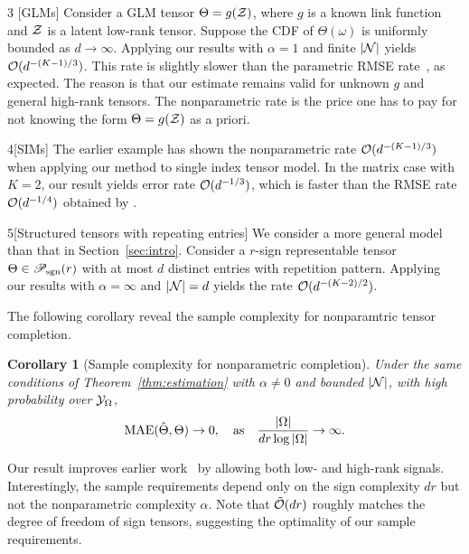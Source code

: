 \documentclass{article}
\theoremstyle{plain}
\newtheorem{cor}{Corollary}
\theoremstyle{definition}
\def\caliP{\mathscr{P}_{\textup{sgn}}}
\begin{document}
\begin{customexample}{3} [GLMs] 
Consider a GLM tensor $\Theta=g(\mathcal{Z})$, where $g$ is a known link function and $\mathcal{Z}$ is a latent low-rank tensor. Suppose the CDF of $\Theta(\omega)$ is uniformly bounded as $d\to\infty$. Applying our results with $\alpha=1$ and finite $|\mathcal{N}|$ yields $\mathcal{O}(d^{-(K-1)/3})$. This rate is slightly slower than the parametric RMSE rate~\citep{zhang2018tensor,wang2018learning}, as expected. The reason is that our estimate remains valid for unknown $g$ and general high-rank tensors. The nonparametric rate is the price one has to pay for not knowing the form $\Theta=g(\mathcal{Z})$ as a priori. 
\end{customexample}
\vspace{.05cm}

\begin{customexample}{4}[SIMs]
The earlier example has shown the nonparametric rate $\mathcal{O}(d^{-(K-1)/3})$ when applying our method to single index tensor model. In the matrix case with $K=2$, our result yields error rate $\mathcal{O}(d^{-1/3})$, which is faster than the RMSE rate $\mathcal{O}(d^{-1/4})$ obtained by \cite{ganti2015matrix}. 
\end{customexample}
\vspace{.05cm}

\begin{customexample}{5}[Structured tensors with repeating entries]
We consider a more general model than that in Section~\ref{sec:intro}. Consider a $r$-sign representable tensor $\Theta\in \caliP(r)$ with at most $d$ distinct entries with repetition pattern. Applying our results with $\alpha=\infty$ and $|\mathcal{N}|=d$ yields the rate $\mathcal{O}(d^{-(K-2)/2})$. 
\end{customexample}

The following corollary reveal the sample complexity for nonparamtric tensor completion. 
\begin{cor}[Sample complexity for nonparametric completion] Under the same conditions of Theorem~\ref{thm:estimation} with $\alpha\neq 0$ and bounded $|\mathcal{N}|$, with high probability over $\mathcal{Y}_\Omega$, 
\[
\textup{MAE}(\hat \Theta, \Theta)\to 0, \quad \text{as}\quad {|\Omega|\over {dr} \log |\Omega|}\to \infty.
\]
\end{cor}
\vspace{-.2cm}
Our result improves earlier work~\citep{yuan2016tensor,ghadermarzy2019near,pmlr-v119-lee20i} by allowing both low- and high-rank signals. Interestingly, the sample requirements depend only on the sign complexity $dr$ but not the nonparametric complexity $\alpha$. Note that $\tilde {\mathcal{O}}(dr)$ roughly matches the degree of freedom of sign tensors, suggesting the optimality of our sample requirements. 
\end{document}
